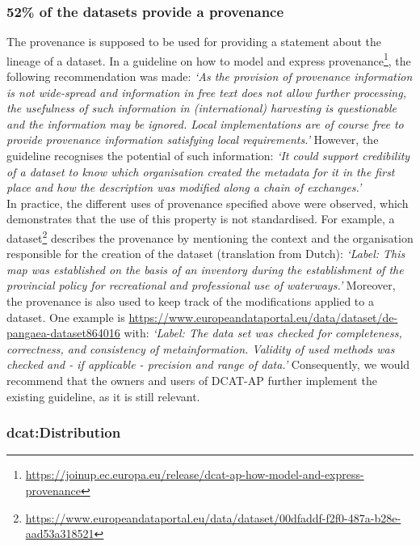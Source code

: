 \documentclass[<options>]{elsarticle}
\begin{document}
\subsubsection{52\% of the datasets provide a provenance}
The provenance is supposed to be used for providing a statement about the lineage of a dataset. In a guideline on how to model and express provenance\footnote{\href{  https://joinup.ec.europa.eu/release/dcat-ap-how-model-and-express-provenance}{  https://joinup.ec.europa.eu/release/dcat-ap-how-model-and-express-provenance}}, the following recommendation was made: \textit{‘As the provision of provenance information is not wide-spread and information in free text does not allow further processing, the usefulness of such information in (international) harvesting is questionable and the information may be ignored. Local implementations are of course free to provide provenance information satisfying local requirements.’ }However, the guideline recognises the potential of such information: \textit{‘It could support credibility of a dataset to know which organisation created the metadata for it in the first place and how the description was modified along a chain of exchanges.’}\\
In practice, the different uses of provenance specified above were observed, which demonstrates that the use of this property is not standardised. For example, a dataset\footnote{\href{  https://www.europeandataportal.eu/data/dataset/00dfaddf-f2f0-487a-b28e-aad53a318521}{https://www.europeandataportal.eu/data/dataset/00dfaddf-f2f0-487a-b28e-aad53a318521}} describes the provenance by mentioning the context and the organisation responsible for the creation of the dataset (translation from Dutch): \textit{‘Label: This map was established on the basis of an inventory during the establishment of the provincial policy for recreational and professional use of waterways.’}
Moreover, the provenance is also used to keep track of the modifications applied to a dataset. One example is \url{https://www.europeandataportal.eu/data/dataset/de-pangaea-dataset864016} with: \textit{‘Label: The data set was checked for completeness, correctness, and consistency of metainformation. Validity of used methods was checked and - if applicable - precision and range of data.’} Consequently, we would recommend that the owners and users of DCAT-AP further implement the existing guideline, as it is still relevant.

\subsubsection{dcat:Distribution}
\end{document}
